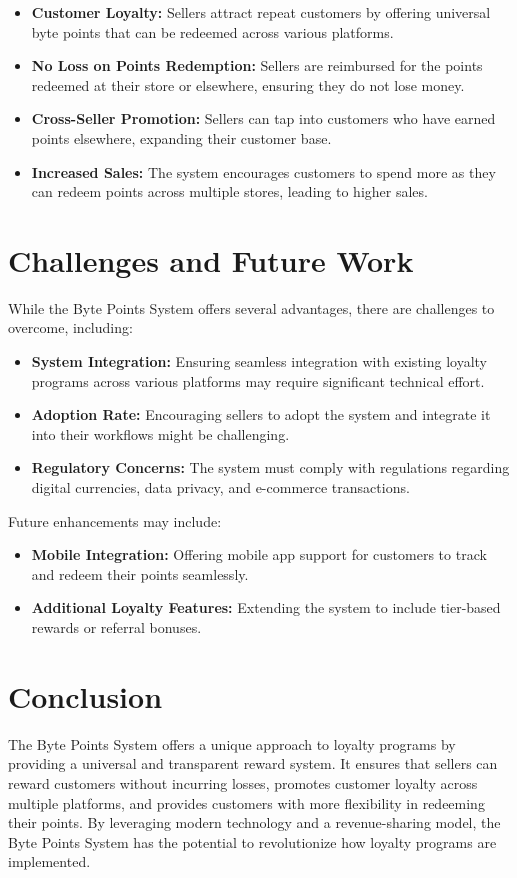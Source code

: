 \documentclass[a4paper,12pt]{article}
\begin{document}
\begin{itemize}
    \item \textbf{Customer Loyalty:} Sellers attract repeat customers by offering universal byte points that can be redeemed across various platforms.
    \item \textbf{No Loss on Points Redemption:} Sellers are reimbursed for the points redeemed at their store or elsewhere, ensuring they do not lose money.
    \item \textbf{Cross-Seller Promotion:} Sellers can tap into customers who have earned points elsewhere, expanding their customer base.
    \item \textbf{Increased Sales:} The system encourages customers to spend more as they can redeem points across multiple stores, leading to higher sales.
\end{itemize}

\section{Challenges and Future Work}
While the Byte Points System offers several advantages, there are challenges to overcome, including:

\begin{itemize}
    \item \textbf{System Integration:} Ensuring seamless integration with existing loyalty programs across various platforms may require significant technical effort.
    \item \textbf{Adoption Rate:} Encouraging sellers to adopt the system and integrate it into their workflows might be challenging.
    \item \textbf{Regulatory Concerns:} The system must comply with regulations regarding digital currencies, data privacy, and e-commerce transactions.
\end{itemize}

Future enhancements may include:
\begin{itemize}
    \item \textbf{Mobile Integration:} Offering mobile app support for customers to track and redeem their points seamlessly.
    \item \textbf{Additional Loyalty Features:} Extending the system to include tier-based rewards or referral bonuses.
\end{itemize}

\section{Conclusion}
The Byte Points System offers a unique approach to loyalty programs by providing a universal and transparent reward system. It ensures that sellers can reward customers without incurring losses, promotes customer loyalty across multiple platforms, and provides customers with more flexibility in redeeming their points. By leveraging modern technology and a revenue-sharing model, the Byte Points System has the potential to revolutionize how loyalty programs are implemented.
\end{document}

